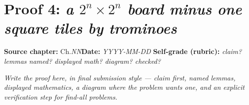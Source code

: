 \documentclass[11pt]{article}
\begin{document}
\section*{Proof 4: \emph{a $2^n\times 2^n$ board minus one square tiles by trominoes}}
\textbf{Source chapter:} Ch.\emph{NN}\quad \textbf{Date:} \emph{YYYY-MM-DD}\quad
\textbf{Self-grade (rubric):} \emph{claim? lemmas named? displayed math? diagram? checked?}
\medskip

\emph{Write the proof here, in final submission style — claim first, named lemmas,
displayed mathematics, a diagram where the problem wants one, and an explicit
verification step for find-all problems.}
\end{document}
